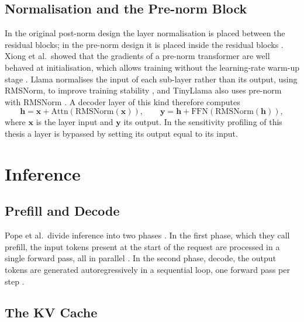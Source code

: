 \documentclass[
11pt, %
english, %
singlespacing, %
headsepline, %
]{MastersDoctoralThesis} %
\begin{document}
\subsection{Normalisation and the Pre-norm Block}
\label{sec:ch2-norm}

In the original post-norm design the layer normalisation is placed between the residual blocks; in the pre-norm design it is placed inside the residual blocks \cite{xiong2020layernorm}. Xiong et al.\ showed that the gradients of a pre-norm transformer are well behaved at initialisation, which allows training without the learning-rate warm-up stage \cite{xiong2020layernorm}. Llama normalises the input of each sub-layer rather than its output, using RMSNorm, to improve training stability \cite{touvron2023llama}, and TinyLlama also uses pre-norm with RMSNorm \cite{zhang2024tinyllama}. A decoder layer of this kind therefore computes
\begin{equation}
  \mathbf{h} = \mathbf{x} + \mathrm{Attn}(\mathrm{RMSNorm}(\mathbf{x})), \qquad
  \mathbf{y} = \mathbf{h} + \mathrm{FFN}(\mathrm{RMSNorm}(\mathbf{h})),
  \label{eq:ch2-block}
\end{equation}
where $\mathbf{x}$ is the layer input and $\mathbf{y}$ its output. In the sensitivity profiling of this thesis a layer is bypassed by setting its output equal to its input.

\section{Inference}
\label{sec:ch2-inference}

\subsection{Prefill and Decode}
\label{sec:ch2-prefill}

Pope et al.\ divide inference into two phases \cite{pope2023efficiently}. In the first phase, which they call prefill, the input tokens present at the start of the request are processed in a single forward pass, all in parallel \cite{pope2023efficiently}. In the second phase, decode, the output tokens are generated autoregressively in a sequential loop, one forward pass per step \cite{pope2023efficiently}.

\subsection{The KV Cache}
\label{sec:ch2-kvcache}
\end{document}
